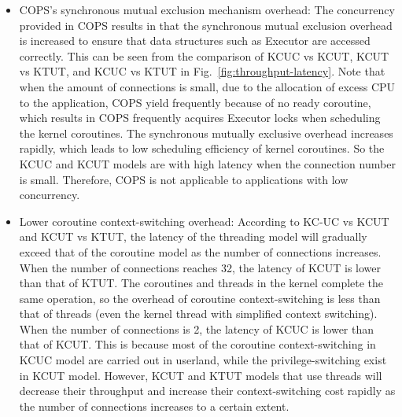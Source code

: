 \documentclass[sigconf,review,anonymous]{acmart}
\begin{document}
\begin{itemize}[leftmargin=*]
\item COPS's synchronous mutual exclusion mechanism overhead: The concurrency provided in COPS results in that the synchronous mutual exclusion overhead is increased to ensure that data structures such as Executor are accessed correctly. This can be seen from the comparison of KCUC vs KCUT, KCUT vs KTUT, and KCUC vs KTUT in Fig.~\ref{fig:throughput-latency}. Note that when the amount of connections is small, due to the allocation of excess CPU to the application, COPS yield frequently because of no ready coroutine, which results in COPS frequently acquires Executor locks when scheduling the kernel coroutines. The synchronous mutually exclusive overhead increases rapidly, which leads to low scheduling efficiency of kernel coroutines. So the KCUC and KCUT models are with high latency when the connection number is small. Therefore, COPS is not applicable to applications with low concurrency. 
\item Lower coroutine context-switching overhead: According to KC-UC vs KCUT and KCUT vs KTUT, the latency of the threading model will gradually exceed that of the coroutine model as the number of connections increases. When the number of connections reaches 32, the latency of KCUT is lower than that of KTUT. The coroutines and threads in the kernel complete the same operation, so the overhead of coroutine context-switching is less than that of threads (even the kernel thread with simplified context switching). When the number of connections is 2, the latency of KCUC is lower than that of KCUT. This is because most of the coroutine context-switching in KCUC model are carried out in userland, while the privilege-switching exist in KCUT model. However, KCUT and KTUT models that use threads will decrease their throughput and increase their context-switching cost rapidly as the number of connections increases to a certain extent. 

\end{itemize}
\end{document}
